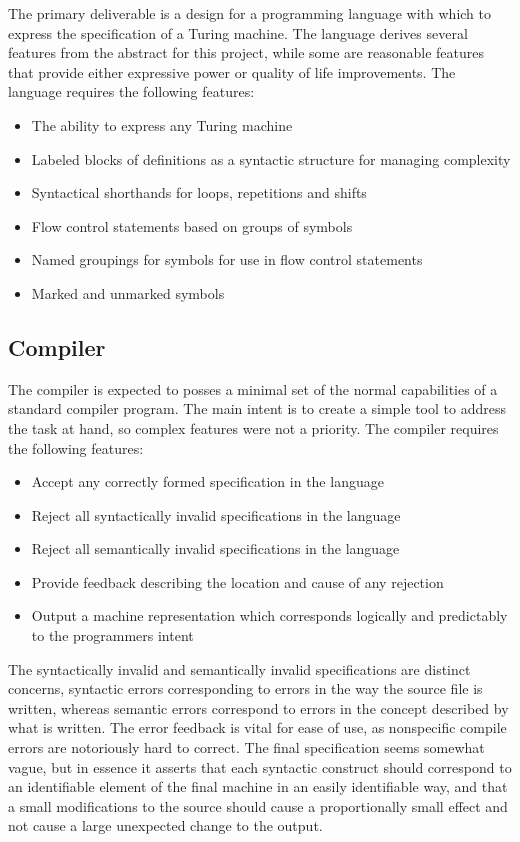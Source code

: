 \documentclass[11pt]{article}
\begin{document}
The primary deliverable is a design for a programming language with which to express the specification of a Turing machine. The language derives several features from the abstract for this project, while some are reasonable features that provide either expressive power or quality of life improvements. The language requires the following features:

\begin{itemize}
	\item The ability to express any Turing machine
	\item Labeled blocks of definitions as a syntactic structure for managing complexity
	\item Syntactical shorthands for loops, repetitions and shifts
	\item Flow control statements based on groups of symbols
	\item Named groupings for symbols for use in flow control statements 
	\item Marked and unmarked symbols
\end{itemize}

\subsection{Compiler}

The compiler is expected to posses a minimal set of the normal capabilities of a standard compiler program. The main intent is to create a simple tool to address the task at hand, so complex features were not a priority. The compiler requires the following features:

\begin{itemize}
	\item Accept any correctly formed specification in the language
	\item Reject all syntactically invalid specifications in the language
	\item Reject all semantically invalid specifications in the language
	\item Provide feedback describing the location and cause of any rejection
	\item Output a machine representation which corresponds logically and predictably to the programmers intent
\end{itemize}

The syntactically invalid and semantically invalid specifications are distinct concerns, syntactic errors corresponding to errors in the way the source file is written, whereas semantic errors correspond to errors in the concept described by what is written. The error feedback is vital for ease of use, as nonspecific compile errors are notoriously hard to correct. The final specification seems somewhat vague, but in essence it asserts that each syntactic construct should correspond to an identifiable element of the final machine in an easily identifiable way, and that a small modifications to the source should cause a proportionally small effect and not cause a large unexpected change to the output.
\end{document}
